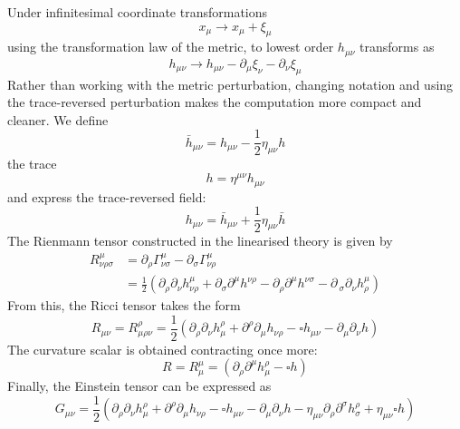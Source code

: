 \documentclass[binding=0.6cm, LaM]{sapthesis}
\begin{document}
	Under infinitesimal coordinate transformations
                 \[
			x_{\mu} \rightarrow x_{\mu} + \xi_{\mu}
                \]
	using the transformation law of the metric, to lowest order $h_{\mu\nu}$ transforms as	
		\[
			h_{\mu\nu} \rightarrow h_{\mu\nu} - \partial_{\mu}\xi_{\nu} - \partial_{\nu}\xi_{\mu}
		\]
	Rather than working with the metric perturbation, changing notation and using the trace-reversed perturbation 
	makes the computation more compact and cleaner. We define
		\begin{equation}
			{\bar h}_{\mu\nu} = h_{\mu\nu} - \frac{1}{2}\eta_{\mu\nu}h  
		\end{equation}
	the trace
		\begin{equation}
			h = \eta^{\mu\nu}h_{\mu\nu}
		\end{equation}
	and express the trace-reversed field:
		\begin{equation}
			h_{\mu\nu} = {\bar h}_{\mu\nu} + \frac{1}{2}\eta_{\mu\nu}{\bar h}
		\end{equation}
	The Rienmann tensor constructed in the linearised theory is given by
		\begin{align}
			R^{\mu}_{\nu\rho\sigma} &= \partial_{\rho} \Gamma^{\mu}_{\nu\sigma} - \partial_{\sigma}\Gamma^{\mu}_{\nu\rho}  \\
				       &= \frac{1}{2} (\partial_{\rho}\partial_{\nu}h^{\mu}_{\nu\rho} + \partial_{\sigma}\partial^{\mu}h^{\nu\rho} - \partial_{\rho}\partial^{\mu}h^{\nu\sigma} - \partial_{\					     \sigma}\partial_{\nu}h^{\mu}_{\rho})
		\end{align}
	From this, the Ricci tensor takes the form
		\begin{equation}
			R_{\mu\nu} = R^{\rho}_{\mu\rho\nu} = \frac{1}{2}(\partial_{\rho}\partial_{\nu}h^{\rho}_{\mu} + \partial^{\rho}\partial_{\mu}h_{\nu\rho} - \square h_{\mu\nu} - \partial_{\mu}\partial_{\nu}h)
		\end{equation}
	The curvature scalar is obtained contracting once more:
		\begin{equation}
			R = R^{\mu}_{\mu} = (\partial_{\rho}\partial^{\mu}h^{\rho}_{\mu} - \square h)
		\end{equation}
	Finally, the Einstein tensor can be expressed as
		\begin{equation}
			G_{\mu\nu} = \frac{1}{2}(\partial_{\rho}\partial_{\nu}h^{\rho}_{\mu} + \partial^{\rho}\partial_{\mu}h_{\nu\rho} - \square h_{\mu\nu} - \partial_{\mu}\partial_{\nu}h - \eta_{\mu\nu}\partial_{\rho}\partial^{\sigma}h^{\rho}_{\sigma} + \eta_{\mu\nu}\square h)
		\end{equation}
\end{document}
